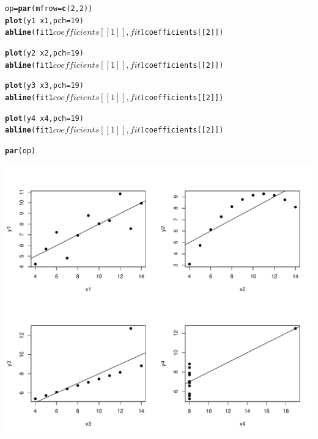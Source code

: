 \documentclass[xcolor=dvipsnames]{beamer}\usepackage{graphicx, color}
\makeatletter
\def\maxwidth{ %
  \ifdim\Gin@nat@width>\linewidth
    \linewidth
  \else
    \Gin@nat@width
  \fi
}
\newcommand{\hlfunctioncall}[1]{\textcolor[rgb]{0.501960784313725,0,0.329411764705882}{\textbf{#1}}}%
\newenvironment{kframe}{%
 \def\at@end@of@kframe{}%
 \ifinner\ifhmode%
  \def\at@end@of@kframe{\end{minipage}}%
  \begin{minipage}{\columnwidth}%
 \fi\fi%
 \def\FrameCommand##1{\hskip\@totalleftmargin \hskip-\fboxsep
 \colorbox{shadecolor}{##1}\hskip-\fboxsep
     \hskip-\linewidth \hskip-\@totalleftmargin \hskip\columnwidth}%
 \MakeFramed {\advance\hsize-\width
   \@totalleftmargin\z@ \linewidth\hsize
   \@setminipage}}%
 {\par\unskip\endMakeFramed%
 \at@end@of@kframe}
\newenvironment{knitrout}{}{} %
\makeatother
\begin{document}
\begin{frame}[fragile]
\begin{knitrout}
\color{fgcolor}\begin{kframe}
\begin{alltt}
op = \hlfunctioncall{par}(mfrow = \hlfunctioncall{c}(2, 2))
\hlfunctioncall{plot}(y1 ~ x1, pch = 19)
\hlfunctioncall{abline}(fit1$coefficients[[1]], fit1$coefficients[[2]])

\hlfunctioncall{plot}(y2 ~ x2, pch = 19)
\hlfunctioncall{abline}(fit1$coefficients[[1]], fit1$coefficients[[2]])

\hlfunctioncall{plot}(y3 ~ x3, pch = 19)
\hlfunctioncall{abline}(fit1$coefficients[[1]], fit1$coefficients[[2]])

\hlfunctioncall{plot}(y4 ~ x4, pch = 19)
\hlfunctioncall{abline}(fit1$coefficients[[1]], fit1$coefficients[[2]])

\hlfunctioncall{par}(op)
\end{alltt}
\end{kframe}
\end{knitrout}

\end{frame}

\begin{frame}[fragile]
\begin{knitrout}
\color{fgcolor}
\includegraphics[width=\maxwidth]{figure/Anscombe4} 

\end{knitrout}

\end{frame}
\end{document}
